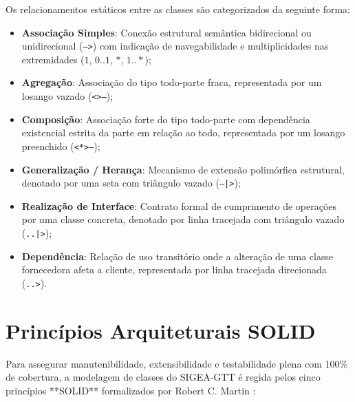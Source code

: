 Os relacionamentos estáticos entre as classes são categorizados da seguinte forma:
\begin{itemize}
    \item \textbf{Associação Simples}: Conexão estrutural semântica bidirecional ou unidirecional (\texttt{-->}) com indicação de navegabilidade e multiplicidades nas extremidades ($1$, $0..1$, $*$, $1..*$);
    \item \textbf{Agregação}: Associação do tipo todo-parte fraca, representada por um losango vazado (\texttt{<>--});
    \item \textbf{Composição}: Associação forte do tipo todo-parte com dependência existencial estrita da parte em relação ao todo, representada por um losango preenchido (\texttt{<*>--});
    \item \textbf{Generalização / Herança}: Mecanismo de extensão polimórfica estrutural, denotado por uma seta com triângulo vazado (\texttt{--|>});
    \item \textbf{Realização de Interface}: Contrato formal de cumprimento de operações por uma classe concreta, denotado por linha tracejada com triângulo vazado (\texttt{..|>});
    \item \textbf{Dependência}: Relação de uso transitório onde a alteração de uma classe fornecedora afeta a cliente, representada por linha tracejada direcionada (\texttt{..>}).
\end{itemize}

\section{Princípios Arquiteturais SOLID}
\label{sec_principios_solid}

Para assegurar manutenibilidade, extensibilidade e testabilidade plena com 100\% de cobertura, a modelagem de classes do SIGEA-GTT é regida pelos cinco princípios **SOLID** formalizados por Robert C. Martin \cite{martin2002}:

